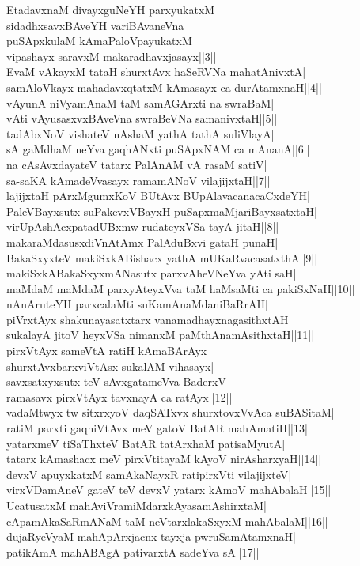 \documentclass{article}
\begin{document}
EtadavxnaM divayxguNeYH parxyukatxM\\
sidadhxsavxBAveYH variBAvaneVna\\
puSApxkulaM kAmaPaloVpayukatxM\\
vipashayx saravxM makaradhavxjasayx||3||\\
EvaM vAkayxM tataH shurxtAvx haSeRVNa mahatAnivxtA|\\
samAloVkayx mahadavxqtatxM kAmasayx ca durAtamxnaH||4||\\
vAyunA niVyamAnaM taM samAGArxti na swraBaM|\\
vAti vAyusasxvxBAveVna swraBeVNa samanivxtaH||5||\\
tadAbxNoV vishateV nAshaM yathA tathA suliVlayA|\\
sA gaMdhaM neYva gaqhANxti puSApxNAM ca mAnanA||6||\\
na cAsAvxdayateV tatarx PalAnAM vA rasaM satiV|\\
sa-saKA kAmadeVvasayx ramamANoV vilajijxtaH||7||\\
lajijxtaH pArxMgumxKoV BUtAvx BUpAlavacanacaCxdeYH|\\
PaleVBayxsutx suPakevxVBayxH puSapxmaMjariBayxsatxtaH|\\
virUpAshAcxpatadUBxmw rudateyxVSa tayA jitaH||8||\\
makaraMdasusxdiVnAtAmx PalAduBxvi gataH punaH|\\
BakaSxyxteV makiSxkABishacx yathA mUKaRvacasatxthA||9||\\
makiSxkABakaSxyxmANasutx parxvAheVNeYva yAti saH|\\
maMdaM maMdaM parxyAteyxVva taM haMsaMti ca pakiSxNaH||10||\\
nAnAruteYH parxcalaMti suKamAnaMdaniBaRrAH|\\
piVrxtAyx shakunayasatxtarx vanamadhayxnagasithxtAH\\
sukalayA jitoV heyxVSa nimanxM paMthAnamAsithxtaH||11||\\
pirxVtAyx sameVtA ratiH kAmaBArAyx\\
shurxtAvxbarxviVtAsx sukalAM vihasayx|\\
savxsatxyxsutx teV sAvxgatameVva BaderxV-\\
ramasavx pirxVtAyx tavxnayA ca ratAyx||12||\\
vadaMtwyx tw sitxrxyoV daqSATxvx shurxtovxVvAca suBASitaM|\\
ratiM parxti gaqhiVtAvx meV gatoV BatAR mahAmatiH||13||\\
yatarxmeV tiSaThxteV BatAR tatArxhaM patisaMyutA|\\
tatarx kAmashacx meV pirxVtitayaM kAyoV nirAsharxyaH||14||\\
devxV apuyxkatxM samAkaNayxR ratipirxVti vilajijxteV|\\
virxVDamAneV gateV teV devxV yatarx kAmoV mahAbalaH||15||\\
UcatusatxM mahAviVramiMdarxkAyasamAshirxtaM|\\
cApamAkaSaRmANaM taM neVtarxlakaSxyxM mahAbalaM||16||\\
dujaRyeVyaM mahApArxjacnx tayxja pwruSamAtamxnaH|\\
patikAmA mahABAgA pativarxtA sadeYva sA||17||\\
\end{document}
